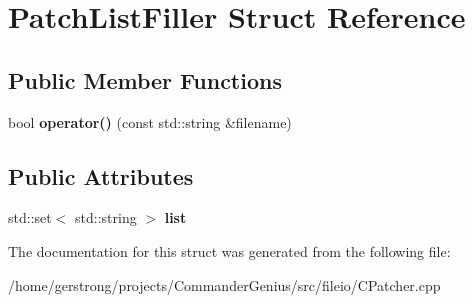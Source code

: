 \hypertarget{struct_patch_list_filler}{
\section{PatchListFiller Struct Reference}
\label{struct_patch_list_filler}
}
\subsection*{Public Member Functions}
\begin{DoxyCompactItemize}
\item 
\hypertarget{struct_patch_list_filler_aa5ce3e1f00b80e87a323c452b8e01aac}{
bool {\bfseries operator()} (const std::string \&filename)}
\label{struct_patch_list_filler_aa5ce3e1f00b80e87a323c452b8e01aac}

\end{DoxyCompactItemize}
\subsection*{Public Attributes}
\begin{DoxyCompactItemize}
\item 
\hypertarget{struct_patch_list_filler_a3bdded5a51f1b316f347e6041ab98381}{
std::set$<$ std::string $>$ {\bfseries list}}
\label{struct_patch_list_filler_a3bdded5a51f1b316f347e6041ab98381}

\end{DoxyCompactItemize}


The documentation for this struct was generated from the following file:\begin{DoxyCompactItemize}
\item 
/home/gerstrong/projects/CommanderGenius/src/fileio/CPatcher.cpp\end{DoxyCompactItemize}
